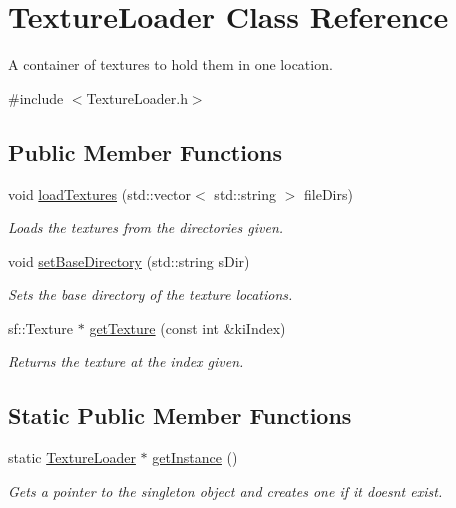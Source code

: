 \hypertarget{class_texture_loader}{}\section{Texture\+Loader Class Reference}
\label{class_texture_loader}


A container of textures to hold them in one location.  




{\ttfamily \#include $<$Texture\+Loader.\+h$>$}

\subsection*{Public Member Functions}
\begin{DoxyCompactItemize}
\item 
void \hyperlink{class_texture_loader_a2f267ecbe1370943f3e42a52dbe902fd}{load\+Textures} (std\+::vector$<$ std\+::string $>$ file\+Dirs)
\begin{DoxyCompactList}\small\item\em Loads the textures from the directories given. \end{DoxyCompactList}\item 
void \hyperlink{class_texture_loader_a27e7357f47e156e8f771358c3e0c1121}{set\+Base\+Directory} (std\+::string s\+Dir)
\begin{DoxyCompactList}\small\item\em Sets the base directory of the texture locations. \end{DoxyCompactList}\item 
sf\+::\+Texture $\ast$ \hyperlink{class_texture_loader_a8211d1fc150e9a03ad40226d2691e3f6}{get\+Texture} (const int \&ki\+Index)
\begin{DoxyCompactList}\small\item\em Returns the texture at the index given. \end{DoxyCompactList}\end{DoxyCompactItemize}
\subsection*{Static Public Member Functions}
\begin{DoxyCompactItemize}
\item 
static \hyperlink{class_texture_loader}{Texture\+Loader} $\ast$ \hyperlink{class_texture_loader_ad606fa221b1796e88e102e8d1f0cf357}{get\+Instance} ()
\begin{DoxyCompactList}\small\item\em Gets a pointer to the singleton object and creates one if it doesnt exist. \end{DoxyCompactList}\end{DoxyCompactItemize}
